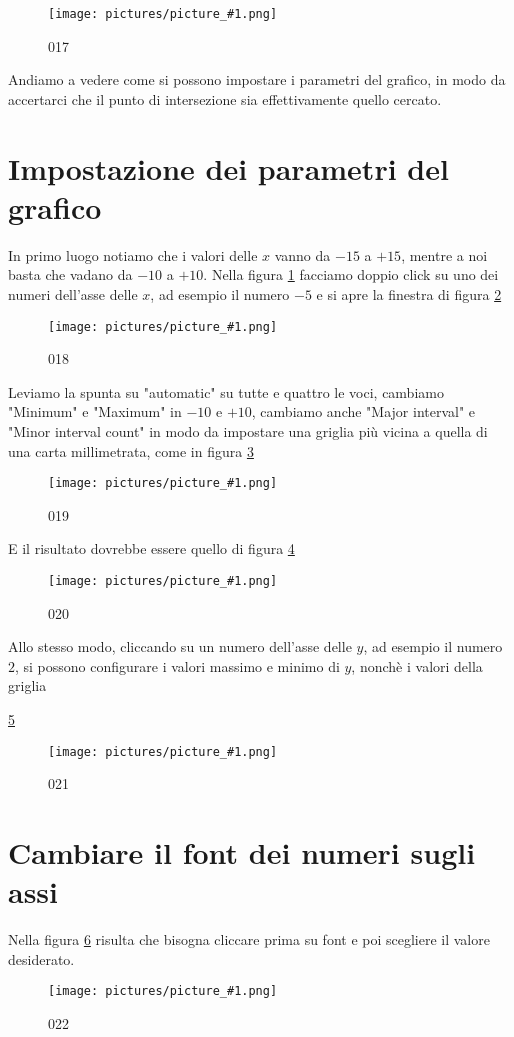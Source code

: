 \documentclass[17pt]{extarticle}
\newcommand{\pict}[1]{
\begin{figure}[h!]		
	\centering
   	\texttt{[image: pictures/picture\_\#1.png]}
  	\caption{#1}
   	\label{fig:LibreOfficeCalc#1}
\end{figure}
}
\begin{document}
%
\pict{017}


Andiamo a vedere come si possono impostare i parametri del grafico, in modo da accertarci che il punto di intersezione sia effettivamente quello cercato.

\newpage
\section{Impostazione dei parametri del grafico}

In primo luogo notiamo che i valori delle $x$ vanno da $-15$ a $+15$, mentre a noi basta che vadano da $-10$ a $+10$. Nella figura \ref{fig:LibreOfficeCalc017} facciamo doppio click su uno dei numeri dell'asse delle $x$, ad esempio il numero $-5$ e si apre la finestra di figura \ref{fig:LibreOfficeCalc018}

%
\pict{018}

Leviamo la spunta su "automatic" su tutte e quattro le voci, cambiamo "Minimum" e "Maximum" in $-10$ e $+10$, cambiamo anche "Major interval" e "Minor interval count" in modo da impostare una griglia più vicina a quella di una carta millimetrata, come in figura \ref{fig:LibreOfficeCalc019}


%
\pict{019}

E il risultato dovrebbe essere quello di figura \ref{fig:LibreOfficeCalc020}

%
\pict{020}

Allo stesso modo, cliccando su un numero dell'asse delle $y$, ad esempio il numero $2$, si possono configurare i valori massimo e minimo di $y$, nonchè i valori della griglia

\ref{fig:LibreOfficeCalc021}


%
\pict{021}


\newpage
\mbox{}
\newpage

\section{Cambiare il font dei numeri sugli assi}

Nella figura \ref{fig:LibreOfficeCalc022} risulta che bisogna cliccare prima su font e poi scegliere il valore desiderato.
%
\pict{022}
\end{document}
